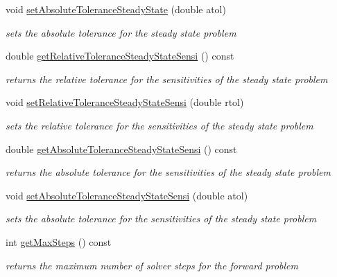 \begin{DoxyCompactItemize}
void \mbox{\hyperlink{classamici_1_1_solver_a78e5814a90b24ff22d5ef1fbed1fc23c}{set\+Absolute\+Tolerance\+Steady\+State}} (double atol)
\begin{DoxyCompactList}\small\item\em sets the absolute tolerance for the steady state problem \end{DoxyCompactList}\item 
double \mbox{\hyperlink{classamici_1_1_solver_ac47e18a62130e7c84a8d7ceb0cb9d7eb}{get\+Relative\+Tolerance\+Steady\+State\+Sensi}} () const
\begin{DoxyCompactList}\small\item\em returns the relative tolerance for the sensitivities of the steady state problem \end{DoxyCompactList}\item 
void \mbox{\hyperlink{classamici_1_1_solver_a7a324b1a30b5246828354c60c86c3583}{set\+Relative\+Tolerance\+Steady\+State\+Sensi}} (double rtol)
\begin{DoxyCompactList}\small\item\em sets the relative tolerance for the sensitivities of the steady state problem \end{DoxyCompactList}\item 
double \mbox{\hyperlink{classamici_1_1_solver_ae1b148791e34ba2220eba9c75d21afb0}{get\+Absolute\+Tolerance\+Steady\+State\+Sensi}} () const
\begin{DoxyCompactList}\small\item\em returns the absolute tolerance for the sensitivities of the steady state problem \end{DoxyCompactList}\item 
void \mbox{\hyperlink{classamici_1_1_solver_a7907d753a8151ececcb4f60cb9721064}{set\+Absolute\+Tolerance\+Steady\+State\+Sensi}} (double atol)
\begin{DoxyCompactList}\small\item\em sets the absolute tolerance for the sensitivities of the steady state problem \end{DoxyCompactList}\item 
int \mbox{\hyperlink{classamici_1_1_solver_acf39690ae4c940c7734fc3fadabb4d50}{get\+Max\+Steps}} () const
\begin{DoxyCompactList}\small\item\em returns the maximum number of solver steps for the forward problem \end{DoxyCompactList}\item 

\end{DoxyCompactItemize}
